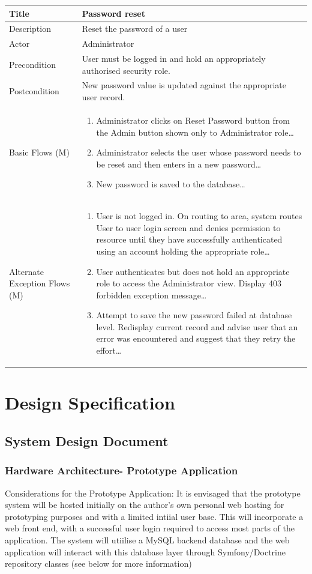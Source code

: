 \documentclass[a4paper,12pt]{article}
\newcommand\addrow[2]{#1 &#2\\ }
\newcommand\addheading[2]{#1 &#2\\ \hline}
\newcommand\tabularhead{\begin{tabular}{lp{8cm}}
\hline
}
\newcommand\addmulrow[2]{ \begin{minipage}[t][][t]{2.5cm}#1\end{minipage}%
   &\begin{minipage}[t][][t]{8cm}
    \begin{enumerate} #2   \end{enumerate}
    \end{minipage}\\ }
\newenvironment{usecase}{\tabularhead}
{\hline\end{tabular}}
\begin{document}
\begin{samepage}
\begin{usecase}
   \addheading{Title}{Password reset}
  \addheading{Description}{Reset the password of a user}
  \addheading{Actor}{Administrator} 
  \addrow{Precondition}{User must be logged in and hold an appropriately authorised security role.}
  \addrow{Postcondition}{New password value is updated against the appropriate user record.}
  \addmulrow{Basic Flows (M)}{\item Administrator clicks on Reset Password button from the Admin button shown only to Administrator role\ldots
  \newpage
  \item Administrator selects the user whose password needs to be reset and then enters in a new password\ldots
  \item New password is saved to the database\ldots}
  \addmulrow{Alternate Exception Flows (M)}{\item User is not logged in. On routing to area, system routes User to user login screen and denies permission to resource until they have successfully authenticated using an account holding the appropriate role\ldots
                                                                      \item User authenticates but does not hold an appropriate role to access the Administrator  view. Display 403 forbidden exception message\ldots
                                                                      \item Attempt to save the new password failed at database level. Redisplay current record and advise user that an error was encountered and suggest that they retry the effort\ldots}
\end{usecase}

\end{samepage}
\newpage
\section{Design Specification}
\subsection {System Design Document}
\subsubsection{Hardware Architecture- Prototype Application}

Considerations for the Prototype Application: It is envisaged that the prototype system will be hosted initially on the author's own personal web hosting for prototyping purposes and with a limited intiial user base. This will incorporate a web front end, with a successful user login required to access most parts of the application. The system will utiilise a MySQL backend database and the web application will interact with this database layer through Symfony/Doctrine repository classes (see below for more information)
\end{document}
